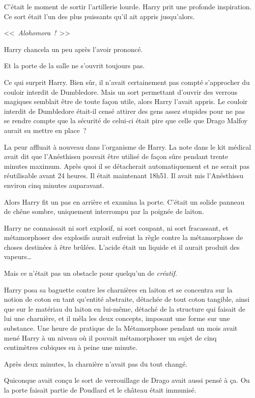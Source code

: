 C'était le moment de sortir l'artillerie lourde. Harry prit une profonde inspiration. Ce sort était l'un des plus puissants qu'il ait appris jusqu'alors.

<<~\emph{Alohomora~!}~>>

Harry chancela un peu après l'avoir prononcé.

Et la porte de la salle ne s'ouvrit toujours pas.

Ce qui surprit Harry. Bien sûr, il n'avait certainement pas compté s'approcher du couloir interdit de Dumbledore. Mais un sort permettant d'ouvrir des verrous magiques semblait être de toute façon utile, alors Harry l'avait appris. Le couloir interdit de Dumbledore était-il censé attirer des gens assez stupides pour ne pas se rendre compte que la sécurité de celui-ci était pire que celle que Drago Malfoy aurait su mettre en place~?

La peur affluait à nouveau dans l'organisme de Harry. La note dans le kit médical avait dit que l'Anésthissu pouvait être utilisé de façon sûre pendant trente minutes maximum. Après quoi il se détacherait automatiquement et ne serait pas réutilisable avant 24 heures. Il était maintenant 18h51. Il avait mis l'Anésthissu environ cinq minutes auparavant.

Alors Harry fit un pas en arrière et examina la porte. C'était un solide panneau de chêne sombre, uniquement interrompu par la poignée de laiton.

Harry ne connaissait ni sort explosif, ni sort coupant, ni sort fracassant, et métamorphoser des explosifs aurait enfreint la règle contre la métamorphose de choses destinées à être brûlées. L'acide était un liquide et il aurait produit des vapeurs…

Mais ce n'était pas un obstacle pour quelqu'un de \emph{créatif}.

Harry posa sa baguette contre les charnières en laiton et se concentra sur la notion de coton en tant qu'entité abstraite, détachée de tout coton tangible, ainsi que sur le matériau du laiton en lui-même, détaché de la structure qui faisait de lui une charnière, et il mêla les deux concepts, imposant une forme sur une substance. Une heure de pratique de la Métamorphose pendant un mois avait mené Harry à un niveau où il pouvait métamorphoser un sujet de cinq centimètres cubiques en à peine une minute.

Après deux minutes, la charnière n'avait pas du tout changé.

Quiconque avait conçu le sort de verrouillage de Drago avait aussi pensé à ça. Ou la porte faisait partie de Poudlard et le château était immunisé.

